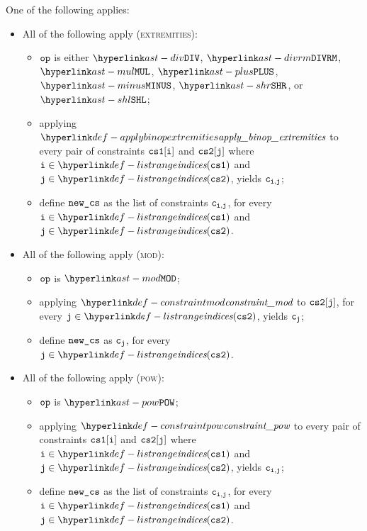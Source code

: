 \ProseParagraph
One of the following applies:
\begin{itemize}
  \item All of the following apply (\textsc{extremities}):
  \begin{itemize}
    \item $\op$ is either $\DIV$, $\DIVRM$, $\MUL$, $\PLUS$, $\MINUS$, $\SHR$, or $\SHL$;
    \item applying $\applybinopextremities$ to every pair of constraints $\csone[\vi]$ and $\cstwo[\vj]$
          where $\vi\in\listrange(\csone)$ and $\vj\in\listrange(\cstwo)$, yields $\vc_{\vi,\vj}$;
    \item define $\newcs$ as the list of constraints $\vc_{\vi,\vj}$, for every
          $\vi\in\listrange(\csone)$ and $\vj\in\listrange(\cstwo)$.
  \end{itemize}

  \item All of the following apply (\textsc{mod}):
  \begin{itemize}
    \item $\op$ is $\MOD$;
    \item applying $\constraintmod$ to $\cstwo[\vj]$, for every $\vj\in\listrange(\cstwo)$, yields $\vc_\vj$;
    \item define $\newcs$ as $\vc_\vj$, for every $\vj\in\listrange(\cstwo)$.
  \end{itemize}

  \item All of the following apply (\textsc{pow}):
  \begin{itemize}
    \item $\op$ is $\POW$;
    \item applying $\constraintpow$ to every pair of constraints $\csone[\vi]$ and $\cstwo[\vj]$
          where $\vi\in\listrange(\csone)$ and $\vj\in\listrange(\cstwo)$, yields $\vc_{\vi,\vj}$;
    \item define $\newcs$ as the list of constraints $\vc_{\vi,\vj}$, for every
          $\vi\in\listrange(\csone)$ and $\vj\in\listrange(\cstwo)$.
  \end{itemize}
\end{itemize}

\FormallyParagraph
\begin{mathpar}
\end{mathpar}

